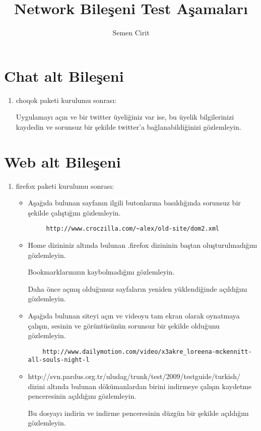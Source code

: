 \documentclass[a4paper,10pt]{article}
\title{Network Bileşeni Test Aşamaları}
\author{Semen Cirit}
\begin{document}
\maketitle

\section{Chat alt Bileşeni}
\begin{enumerate}
\item choqok paketi kurulumu sonrası:

Uygulamayı açın ve bir twitter üyeliğiniz var ise, bu üyelik bilgilerinizi kaydedin ve sorunsuz bir şekilde twitter'a bağlanabildiğinizi gözlemleyin.	
\end{enumerate}
\section{Web alt Bileşeni}
\begin{enumerate}
\item firefox paketi kurulumu sonrası:
\begin{itemize}
 \item Aşağıda bulunan sayfanın ilgili butonlarına basıldığında sorunsuz bir şekilde çalıştığını gözlemleyin.
	\begin{verbatim}
	 http://www.croczilla.com/~alex/old-site/dom2.xml
	\end{verbatim}
 \item Home dizininiz altında bulunan .firefox dizininin baştan oluşturulmadığını gözlemleyin.
	
	Bookmarklarınızın kaybolmadığını gözlemleyin.
	
 	Daha önce açmış olduğunuz sayfaların yeniden yüklendiğinde açıldığını gözlemleyin.

\item Aşağıda bulunan siteyi açın ve videoyu tam ekran olarak oynatmaya çalışın, sesinin ve görüntüsünün sorunsuz bir şekilde olduğunu gözlemleyin.
	\begin{verbatim}
	http://www.dailymotion.com/video/x3akre_loreena-mckennitt-all-souls-night-l  
	\end{verbatim}
\item http://svn.pardus.org.tr/uludag/trunk/test/2009/testguide/turkish/ dizini altında bulunan dökümanlardan birini indirmeye çalışın kaydetme penceresinin açıldığını gözlemleyin.

Bu dosyayı indirin ve indirme penceresinin düzgün bir şekilde açıldığını gözlemleyin.
\end{itemize}


\end{enumerate}
\end{document}
